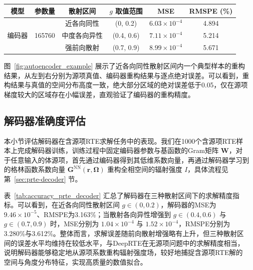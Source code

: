 \begin{table}[!htp]
    \centering
    \begin{tabular}{@{}cccccc@{}}
        \toprule
        模型                   & 参数量                     & 散射区间   & $g$ 取值范围   & MSE                  & RMSPE (\%) \\ \midrule
        \multirow{3}{*}{编码器} & \multirow{3}{*}{165760} & 近各向同性  & (0, 0.2)   & $6.03\times 10^{-4}$ & 4.894      \\ \cmidrule(l){3-6}
                             &                         & 中度各向异性 & (0.4, 0.6) & $7.11\times 10^{-4}$ & 5.214      \\ \cmidrule(l){3-6}
                             &                         & 强前向散射  & (0.7, 0.9) & $8.99\times 10^{-4}$ & 5.671      \\ \bottomrule
    \end{tabular}
    \label{tab:accuracy_prte}
\end{table}

图~\ref{fig:autoencoder_example} 展示了近各向同性散射区间内一个典型样本的重构结果，从左到右分别为源项真值、编码器重构结果与逐点绝对误差。可以看到，重构结果与真值的空间分布高度一致，绝大部分区域的绝对误差低于0.05，仅在源项梯度较大的区域存在小幅误差，直观验证了编码器的重构精度。

\subsection{解码器准确度评估}

本小节评估解码器在含源项RTE求解任务中的表现。我们在1000个含源项RTE样本上完成解码器训练，训练过程中固定编码器参数与基函数的Gram矩阵 $\boldsymbol{W}$，对于任意输入的体源项，首先通过编码器得到其低维系数向量，再通过解码器学习到的格林函数系数向量 $\boldsymbol{G}^{\text{NN}}(\boldsymbol{r},\boldsymbol{\Omega})$ 重构全相空间的辐射强度 $I$，具体流程见第~\ref{sec:prte-decoder} 节。

表~\ref{tab:accuracy_prte_decoder} 汇总了解码器在三种散射区间下的求解精度指标。可以看到，在近各向同性散射区间 $g\in(0,0.2)$，解码器的MSE为 $9.46\times 10^{-5}$、RMSPE为3.163\%；当散射各向异性增强到 $g\in(0.4,0.6)$ 与 $g\in(0.7,0.9)$ 时，MSE分别为 $1.04\times 10^{-4}$ 与 $1.52\times 10^{-4}$，RMSPE分别为3.280\%与3.612\%。整体而言，求解误差随前向散射增强略有上升，但三种散射区间的误差水平均维持在较低水平，与DeepRTE在无源项问题中的求解精度相当，说明解码器能够稳定地从源项系数重构辐射强度场，较好地捕捉含源项RTE解的空间与角度分布特征，实现高质量的数值拟合。

